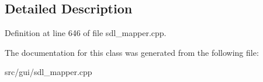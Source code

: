 \subsection{Detailed Description}


Definition at line 646 of file sdl\-\_\-mapper.\-cpp.



The documentation for this class was generated from the following file\-:\begin{DoxyCompactItemize}
\item 
src/gui/sdl\-\_\-mapper.\-cpp\end{DoxyCompactItemize}
